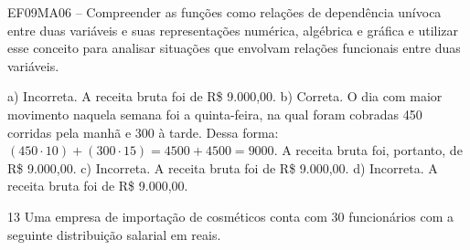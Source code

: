 \begin{escolha}
\begin{boxmedio}
\begin{boxmedio}
{\begin{boxpeq}
\begin{boxpeq}
{\begin{boxpeq}
\begin{boxmedio}
\begin{boxmedio}
\begin{boxpeq}
\begin{boxmedio}
\begin{boxpeq}
\begin{boxpeq}
\begin{boxpeq}
\begin{boxpeq}
\begin{boxmedio}
{\begin{boxmedio}
\begin{boxmedio}
\begin{boxpeq}
\begin{boxmedio}
\begin{boxpeq}
\begin{boxpeq}
\begin{boxpeq}
\begin{escolha}
{\begin{boxmedio}
\begin{boxpeq}
\begin{boxpeq}
\begin{boxpeq}
\begin{boxpeq}
\begin{boxpeq}
\begin{boxmedio}
\begin{boxpeq}
\begin{boxpeq}
\begin{boxpeq}
{\begin{boxpeq}
\begin{boxmedio}
\begin{boxpeq}
\begin{boxpeq}
\begin{boxpeq}
{\begin{boxpeq}
\begin{boxmedio}
{\begin{boxpeq}
\begin{boxpeq}
\begin{boxmedio}
\begin{boxmedio}
\begin{boxpeq}
\begin{boxpeq}
{\begin{boxpeq}
\begin{boxpeq}
\begin{boxpeq}
\begin{boxpeq}
\begin{boxpeq}
\begin{escolha}
\begin{escolha}
{\begin{boxmedio}
\begin{boxpeq}
\begin{q°}
\begin{boxmedio}
\begin{boxpeq}
\begin{boxpeq}
\begin{boxmedio}
\begin{boxmedio}
\begin{boxmedio}
\begin{boxmedio}
{\begin{escolha}
\begin{escolha}
{EF09MA06 -- Compreender as funções como relações de dependência unívoca
entre duas variáveis e suas representações numérica, algébrica e gráfica
e utilizar esse conceito para analisar situações que envolvam relações
funcionais entre duas variáveis.

a) Incorreta. A receita bruta foi de R\$ 9.000,00.
b) Correta. O dia com maior movimento naquela semana foi a quinta-feira,
na qual foram cobradas 450 corridas pela manhã e 300 à tarde. Dessa forma:
$(450 \cdot 10) + (300 \cdot 15) = 4500 + 4500 = 9000$. A receita bruta
foi, portanto, de R\$ 9.000,00.
c) Incorreta. A receita bruta foi de R\$ 9.000,00.
d) Incorreta. A receita bruta foi de R\$ 9.000,00.}

\num{13} Uma empresa de importação de cosméticos conta com 30 funcionários
com a seguinte distribuição salarial em reais.


\end{escolha}
\end{escolha}}
\end{boxmedio}
\end{boxmedio}
\end{boxmedio}
\end{boxmedio}
\end{boxpeq}
\end{boxpeq}
\end{boxmedio}
\end{q°}
\end{boxpeq}
\end{boxmedio}}
\end{escolha}
\end{escolha}
\end{boxpeq}
\end{boxpeq}
\end{boxpeq}
\end{boxpeq}
\end{boxpeq}}
\end{boxpeq}
\end{boxpeq}
\end{boxmedio}
\end{boxmedio}
\end{boxpeq}
\end{boxpeq}}
\end{boxmedio}
\end{boxpeq}}
\end{boxpeq}
\end{boxpeq}
\end{boxpeq}
\end{boxmedio}
\end{boxpeq}}
\end{boxpeq}
\end{boxpeq}
\end{boxpeq}
\end{boxmedio}
\end{boxpeq}
\end{boxpeq}
\end{boxpeq}
\end{boxpeq}
\end{boxpeq}
\end{boxmedio}}
\end{escolha}
\end{boxpeq}
\end{boxpeq}
\end{boxpeq}
\end{boxmedio}
\end{boxpeq}
\end{boxmedio}
\end{boxmedio}}
\end{boxmedio}
\end{boxpeq}
\end{boxpeq}
\end{boxpeq}
\end{boxpeq}
\end{boxmedio}
\end{boxpeq}
\end{boxmedio}
\end{boxmedio}
\end{boxpeq}}
\end{boxpeq}
\end{boxpeq}}
\end{boxmedio}
\end{boxmedio}
\end{escolha}
